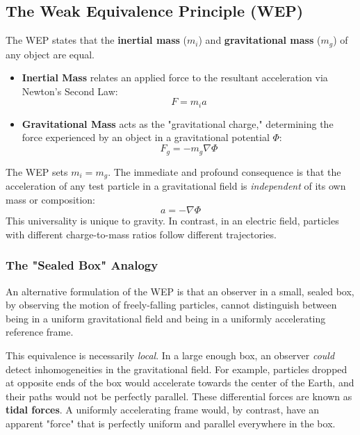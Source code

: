 \documentclass[11pt, a4paper]{report}
\begin{document}
\subsection*{The Weak Equivalence Principle (WEP)}
The WEP states that the \textbf{inertial mass} ($m_i$) and \textbf{gravitational mass} ($m_g$) of any object are equal.

\begin{itemize}
    \item \textbf{Inertial Mass} relates an applied force to the resultant acceleration via Newton's Second Law:
    \begin{equation}
        F = m_i a
    \end{equation}
    \item \textbf{Gravitational Mass} acts as the "gravitational charge," determining the force experienced by an object in a gravitational potential $\Phi$:
    \begin{equation}
        F_g = -m_g \nabla \Phi
    \end{equation}
\end{itemize}

The WEP sets $m_i = m_g$. The immediate and profound consequence is that the acceleration of any test particle in a gravitational field is \emph{independent} of its own mass or composition:
\begin{equation}
    a = -\nabla \Phi
\end{equation}
This universality is unique to gravity. In contrast, in an electric field, particles with different charge-to-mass ratios follow different trajectories.

\subsubsection*{The "Sealed Box" Analogy}
An alternative formulation of the WEP is that an observer in a small, sealed box, by observing the motion of freely-falling particles, cannot distinguish between being in a uniform gravitational field and being in a uniformly accelerating reference frame.

This equivalence is necessarily \emph{local}. In a large enough box, an observer \emph{could} detect inhomogeneities in the gravitational field. For example, particles dropped at opposite ends of the box would accelerate towards the center of the Earth, and their paths would not be perfectly parallel. These differential forces are known as \textbf{tidal forces}. A uniformly accelerating frame would, by contrast, have an apparent "force" that is perfectly uniform and parallel everywhere in the box.
\end{document}
